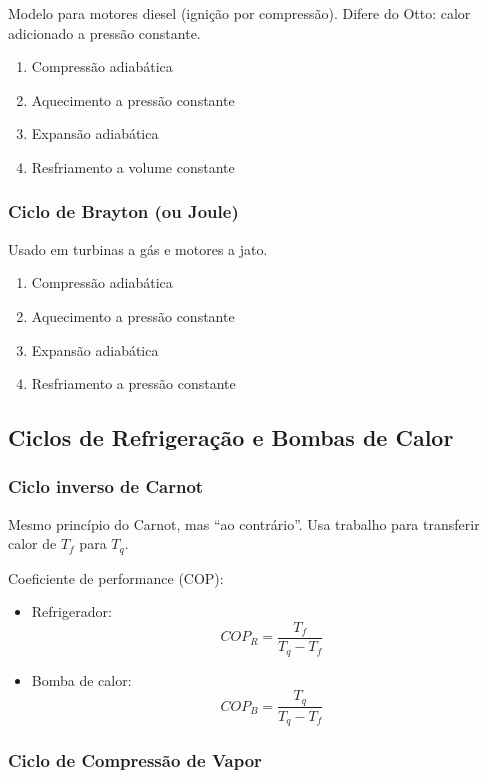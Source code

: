 Modelo para motores diesel (ignição por compressão). Difere do Otto: calor adicionado a pressão constante.

\begin{enumerate}
  \item Compressão adiabática
  \item Aquecimento a pressão constante
  \item Expansão adiabática
  \item Resfriamento a volume constante
\end{enumerate}

\subsubsection*{Ciclo de Brayton (ou Joule)}

Usado em turbinas a gás e motores a jato.

\begin{enumerate}
  \item Compressão adiabática
  \item Aquecimento a pressão constante
  \item Expansão adiabática
  \item Resfriamento a pressão constante
\end{enumerate}

\subsection*{Ciclos de Refrigeração e Bombas de Calor}

\subsubsection*{Ciclo inverso de Carnot}

Mesmo princípio do Carnot, mas “ao contrário”. Usa trabalho para transferir calor de \(T_f\) para \(T_q\).

Coeficiente de performance (COP):
\begin{itemize}
  \item Refrigerador: 
  \[
  COP_R = \frac{T_f}{T_q - T_f}
  \]
  \item Bomba de calor: 
  \[
  COP_B = \frac{T_q}{T_q - T_f}
  \]
\end{itemize}

\subsubsection*{Ciclo de Compressão de Vapor}

